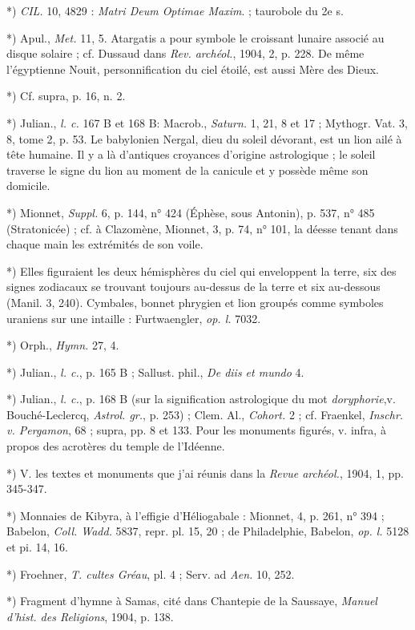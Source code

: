 \documentclass[a4paper, 11pt, oneside, polutonikogreek, french]{article}
\begin{document}
*) \emph{CIL.} 10, 4829 : \emph{Matri Deum Optimae Maxim}. ; taurobole du 2e s.

*) Apul., \emph{Met.} 11, 5. Atargatis a pour symbole le croissant lunaire associé au disque solaire ; cf. Dussaud dans \emph{Rev. archéol.}, 1904, 2, p. 228. De même l'égyptienne Nouit, personnification du ciel étoilé, est aussi Mère des Dieux.

*) Cf. supra, p. 16, n. 2.

*) Julian., \emph{l. c.} 167 B et 168 B: Macrob., \emph{Saturn.} 1, 21, 8 et 17 ; Mythogr. Vat. 3, 8, tome 2, p. 53. Le babylonien Nergal, dieu du soleil dévorant, est un lion ailé à tête humaine. Il y a là d'antiques croyances d'origine astrologique ; le soleil traverse le signe du lion au moment de la canicule et y possède même son domicile.

*) Mionnet, \emph{Suppl.} 6, p. 144, n° 424 (Éphèse, sous Antonin), p. 537, n° 485 (Stratonicée) ; cf. à Clazomène, Mionnet, 3, p. 74, n° 101, la déesse tenant dans chaque main les extrémités de son voile.

*) Elles figuraient les deux hémisphères du ciel qui enveloppent la terre, six des signes zodiacaux se trouvant toujours au-dessus de la terre et six au-dessous (Manil. 3, 240). Cymbales, bonnet phrygien et lion groupés comme symboles uraniens sur une intaille : Furtwaengler, \emph{op. l.} 7032.

*) Orph., \emph{Hymn.} 27, 4.

*) Julian., \emph{l. c.}, p. 165 B ; Sallust. phil., \emph{De diis et mundo} 4.

*) Julian., \emph{l. c.}, p. 168 B (sur la signification astrologique du mot \emph{doryphorie},v. Bouché-Leclercq, \emph{Astrol. gr.}, p. 253) ; Clem. Al., \emph{Cohort.} 2 ; cf. Fraenkel, \emph{Inschr. v. Pergamon}, 68 ; supra, pp. 8 et 133. Pour les monuments figurés, v. infra, à propos des acrotères du temple de l'Idéenne.

*) V. les textes et monuments que j'ai réunis dans la \emph{Revue archéol.}, 1904, 1, pp. 345-347.

*) Monnaies de Kibyra, à l'effigie d'Héliogabale : Mionnet, 4, p. 261, n° 394 ; Babelon, \emph{Coll. Wadd.} 5837, repr. pl. 15, 20 ; de Philadelphie, Babelon, \emph{op. l.} 5128 et pi. 14, 16.

*) Froehner, \emph{T. cultes Gréau}, pl. 4 ; Serv. ad \emph{Aen.} 10, 252.

*) Fragment d'hymne à Samas, cité dans Chantepie de la Saussaye, \emph{Manuel d'hist. des Religions}, 1904, p. 138.
\end{document}
